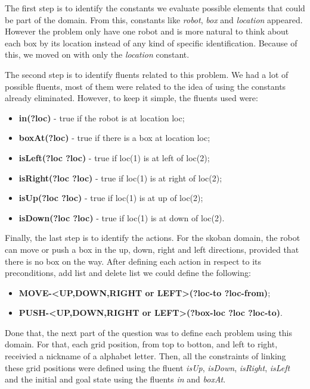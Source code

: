 \documentclass[10pt, letter]{article}
\begin{document}
The first step is to identify the constants we evaluate possible elements that could be part of the domain. From this, constants like \textit{robot}, \textit{box} and \textit{location} appeared. However the problem only have one robot and is more natural to think about each box by its location instead of any kind of specific identification. Because of this, we moved on with only the \textit{location} constant.

The second step is to identify fluents related to this problem. We had a lot of possible fluents, most of them were related to the idea of using the constants already eliminated. However, to keep it simple, the fluents used were:

\begin{itemize}
\item \textbf{in(?loc)} - true if the robot is at location loc;
\item \textbf{boxAt(?loc)} - true if there is a box at location loc;
\item \textbf{isLeft(?loc ?loc)} - true if loc(1) is at left of loc(2);
\item \textbf{isRight(?loc ?loc)} - true if loc(1) is at right of loc(2);
\item \textbf{isUp(?loc ?loc)} - true if loc(1) is at up of loc(2);
\item \textbf{isDown(?loc ?loc)} - true if loc(1) is at down of loc(2).
\end{itemize} 

Finally, the last step is to identify the actions. For the skoban domain, the robot can move or push a box in the up, down, right and left directions, provided that there is no box on the way. After defining each action in respect to its preconditions, add list and delete list we could define the following:

\begin{itemize}
\item \textbf{MOVE-<UP,DOWN,RIGHT or LEFT>(?loc-to ?loc-from)};
\item \textbf{PUSH-<UP,DOWN,RIGHT or LEFT>(?box-loc ?loc ?loc-to)}.
\end{itemize} 

Done that, the next part of the question was to define each problem using this domain. For that, each grid position, from top to botton, and left to right, receivied a nickname of a alphabet letter. Then, all the constraints of linking these grid positions were defined using the fluent \textit{isUp}, \textit{isDown}, \textit{isRight}, \textit{isLeft} and the initial and goal state using the fluents \textit{in} and \textit{boxAt}.
\end{document}
